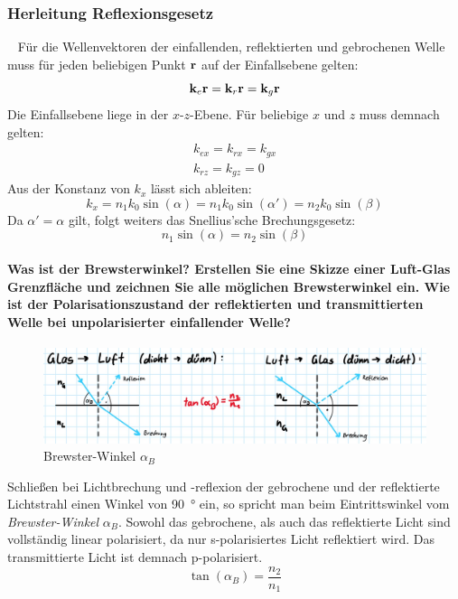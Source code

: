 \documentclass[a4paper, 11pt, ngerman, parskip=half-]{scrartcl}
\begin{document}
\subsubsection*{Herleitung Reflexionsgesetz}~
%
Für die Wellenvektoren der einfallenden, reflektierten und gebrochenen
Welle muss für jeden beliebigen Punkt $\vb{r}$ auf der Einfallsebene
gelten:
%
\begin{equation}
	\vb{k}_e \vb{r} = \vb{k}_r \vb{r} = \vb{k}_g \vb{r}
\end{equation}
%
Die Einfallsebene liege in der $x$-$z$-Ebene. Für beliebige $x$ und $z$
muss demnach gelten:
%
\begin{equation}
	\begin{split}
		k_{ex} = k_{rx} = k_{gx} \\
		k_{rz} = k_{gz} = 0
	\end{split}
\end{equation}
%
Aus der Konstanz von $k_x$ lässt sich ableiten:
%
\begin{equation}
	k_x = n_1 k_0 \sin(\alpha) = n_1 k_0 \sin(\alpha') = n_2 k_0 \sin(\beta)
\end{equation}
%
Da $\alpha' = \alpha$ gilt, folgt weiters das Snellius'sche Brechungsgesetz:
%
\begin{equation}
	n_1 \sin(\alpha) = n_2 \sin(\beta)
\end{equation}
%
\paragraph{Was ist der Brewsterwinkel? Erstellen Sie eine Skizze einer Luft-Glas Grenzfläche und zeichnen Sie alle möglichen Brewsterwinkel ein. Wie ist der Polarisationszustand der reflektierten und transmittierten Welle bei unpolarisierter einfallender Welle?}
%
\begin{figure}[H]
    \centering
    \begin{samepage}
        \includegraphics[width=\textwidth]{image/15/brewster.jpg}
        \caption{Brewster-Winkel $\alpha_B$}
        \label{fig:brewster-winkel}
    \end{samepage}
\end{figure}
%
Schließen bei Lichtbrechung und -reflexion der gebrochene und der reflektierte Lichtstrahl einen Winkel von \SI{90}{\degree} ein, so spricht man beim Eintrittswinkel vom \textit{Brewster-Winkel} $\alpha_B$. Sowohl das gebrochene, als auch das reflektierte Licht sind vollständig linear polarisiert, da nur s-polarisiertes Licht reflektiert wird. Das transmittierte Licht ist demnach p-polarisiert.
%
\begin{equation}
    \label{eq:brewster-winkel}
    \tan(\alpha_B) = \frac{n_2}{n_1}
\end{equation}
\end{document}
